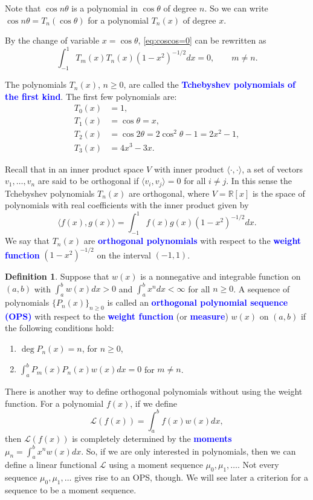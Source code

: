 \documentclass{amsart}
\numberwithin{equation}{section}
\theoremstyle{definition}
\newtheorem{defn}[thm]{Definition}
\newcommand{\RR}{\mathbb{R}}
\newcommand\LL{\mathcal{L}}
\renewcommand\emph[1]{\textcolor{blue}{\bf #1}}
\begin{document}
Note that \( \cos n\theta \) is a polynomial in \( \cos\theta \) of
degree \( n \). So we can write \( \cos n\theta = T_n(\cos\theta) \)
for a polynomial \( T_n(x) \) of degree \( x \).

By the change of variable \( x=\cos \theta \), \eqref{eq:coscos=0} can
be rewritten as
\[
  \int_{-1}^1 T_m(x)T_n(x) (1-x^2)^{-1/2} dx = 0, \qquad m\ne n.
\]

The polynomials \( T_n(x) \), \( n\ge0 \), are called the
\emph{Tchebyshev polynomials of the first kind}.
The first few polynomials are:
\begin{align*}
 T_0(x) &= 1, \\
 T_1(x) &= \cos\theta = x, \\
 T_2(x) &= \cos2\theta = 2\cos^2\theta-1 = 2x^2-1, \\
 T_3(x) &= 4x^3-3x.
\end{align*}

Recall that in an inner product space \( V \) with inner product
\( \langle \cdot,\cdot \rangle \), a set of vectors
\( v_1,\dots,v_n \) are said to be orthogonal if
\( \langle v_i,v_j \rangle = 0 \) for all \( i\ne j \). In this sense
the Tchebyshev polynomials \( T_n(x) \) are orthogonal, where
\( V = \RR[x] \) is the space of polynomials with real coefficients
with the inner product given by
\[
  \langle f(x), g(x) \rangle = \int_{-1}^1 f(x)g(x) (1-x^2)^{-1/2} dx.
\]
We say that \( T_n(x) \) are \emph{orthogonal polynomials} with
respect to the \emph{weight function} \( (1-x^2)^{-1/2} \) on the
interval \( (-1,1) \).

\begin{defn}\label{def:OPS1}
  Suppose that \( w(x) \) is a nonnegative and integrable function on
  \( (a,b) \) with \( \int_a^b w(x)dx >0 \) and
  \( \int_a^b x^n dx < \infty \) for all \( n\ge0 \). A sequence of
  polynomials \( \{P_n(x)\}_{n\ge0} \) is called an \emph{orthogonal
    polynomial sequence (OPS)} with respect to the \emph{weight
    function} (or \emph{measure}) \( w(x) \) on \( (a,b) \) if the
  following conditions hold:
  \begin{enumerate}
  \item \( \deg P_n(x) = n \), for \( n\ge0 \),
  \item \( \int_a^b P_m(x)P_n(x) w(x)dx = 0 \) for \( m\ne n \).
  \end{enumerate}
\end{defn}

There is another way to define orthogonal polynomials without using
the weight function. For a polynomial \( f(x) \), if we define
\[
  \LL(f(x)) = \int_a^b f(x) w(x)dx,
\]
then \( \LL(f(x)) \) is completely determined by the \emph{moments}
\( \mu_n = \int_a^b x^n w(x)dx \). So, if we are only interested in
polynomials, then we can define a linear functional \( \LL \) using a
moment sequence \( \mu_0,\mu_1,\dots \). Not every sequence
\( \mu_0,\mu_1,\dots \) gives rise to an OPS, though. We will see
later a criterion for a sequence to be a moment sequence.
\end{document}
